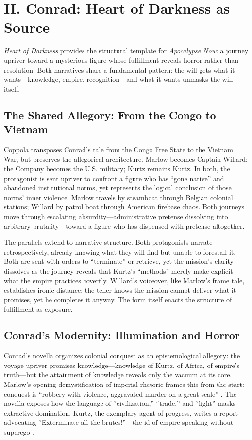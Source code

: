 \section*{II. Conrad: Heart of Darkness as Source}
\label{sec:ii-conrad}

\textit{Heart of Darkness} \parencite{ConradHOD1990} provides the structural template for
\textit{Apocalypse Now}: a journey upriver toward a mysterious figure whose fulfillment reveals
horror rather than resolution. Both narratives share a fundamental
pattern: the will gets what it wants---knowledge, empire, recognition---and what it wants
unmasks the will itself.

\subsection*{The Shared Allegory: From the Congo to Vietnam}
\label{ssec:the-shared-allegory}
Coppola transposes Conrad's tale from the Congo Free State to the Vietnam War, but preserves
the allegorical architecture. Marlow becomes Captain Willard; the Company becomes the U.S.
military; Kurtz remains Kurtz. In both, the protagonist is sent upriver to confront a figure
who has ``gone native'' and abandoned institutional norms, yet represents the logical
conclusion of those norms' inner violence. Marlow travels by steamboat through Belgian colonial
stations; Willard by patrol boat through American firebase chaos. Both journeys move through
escalating absurdity—administrative pretense dissolving into arbitrary brutality—toward a
figure who has dispensed with pretense altogether.

The parallels extend to narrative structure. Both protagonists narrate retrospectively, already
knowing what they will find but unable to forestall it. Both are sent with orders to
``terminate'' or retrieve, yet the mission's clarity dissolves as the journey reveals that
Kurtz's ``methods'' merely make explicit what the empire practices covertly. Willard's
voiceover, like Marlow's frame tale, establishes ironic distance: the teller knows the mission
cannot deliver what it promises, yet he completes it anyway. The form itself enacts the
structure of fulfillment-as-exposure.

\subsection*{Conrad's Modernity: Illumination and Horror}
\label{ssec:conrad-s-modernity-illumination-and-horror}
Conrad's novella organizes colonial conquest as an epistemological allegory: the voyage upriver
promises knowledge—knowledge of Kurtz, of Africa, of empire's truth—but the attainment of
knowledge reveals only the vacuum at its core. Marlow's opening demystification of imperial
rhetoric frames this from the start: conquest is ``robbery with violence, aggravated murder on
a great scale'' \parencite{ConradHOD1990}. The novella exposes how the language of
``civilization,'' ``trade,'' and ``light'' masks extractive domination. Kurtz, the exemplary
agent of progress, writes a report advocating ``Exterminate all the brutes!''—the id of empire
speaking without superego \parencite{ConradHOD1990}.

